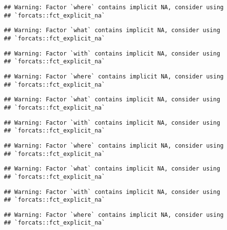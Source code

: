 \documentclass[11pt, a4paper]{awesome-cv}
\begin{document}
\begin{verbatim}
## Warning: Factor `where` contains implicit NA, consider using
## `forcats::fct_explicit_na`
\end{verbatim}

\begin{verbatim}
## Warning: Factor `what` contains implicit NA, consider using
## `forcats::fct_explicit_na`
\end{verbatim}

\begin{verbatim}
## Warning: Factor `with` contains implicit NA, consider using
## `forcats::fct_explicit_na`
\end{verbatim}

\begin{verbatim}
## Warning: Factor `where` contains implicit NA, consider using
## `forcats::fct_explicit_na`
\end{verbatim}

\begin{verbatim}
## Warning: Factor `what` contains implicit NA, consider using
## `forcats::fct_explicit_na`
\end{verbatim}

\begin{verbatim}
## Warning: Factor `with` contains implicit NA, consider using
## `forcats::fct_explicit_na`
\end{verbatim}

\begin{verbatim}
## Warning: Factor `where` contains implicit NA, consider using
## `forcats::fct_explicit_na`
\end{verbatim}

\begin{verbatim}
## Warning: Factor `what` contains implicit NA, consider using
## `forcats::fct_explicit_na`
\end{verbatim}

\begin{verbatim}
## Warning: Factor `with` contains implicit NA, consider using
## `forcats::fct_explicit_na`
\end{verbatim}

\begin{verbatim}
## Warning: Factor `where` contains implicit NA, consider using
## `forcats::fct_explicit_na`
\end{verbatim}
\end{document}
